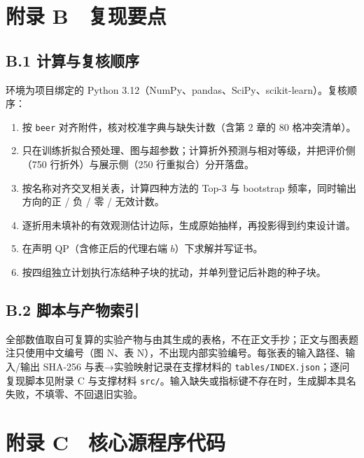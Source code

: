 \documentclass[11pt,a4paper]{article}
\providecommand{\tightlist}{%
  \setlength{\itemsep}{0pt}\setlength{\parskip}{0pt}}
\begin{document}
\section*{附录
B　复现要点}\label{ux9644ux5f55-b-ux590dux73b0ux8981ux70b9}

\subsection*{B.1
计算与复核顺序}\label{b.1-ux8ba1ux7b97ux4e0eux590dux6838ux987aux5e8f}

环境为项目绑定的 Python
3.12（NumPy、pandas、SciPy、scikit-learn）。复核顺序：

\begin{enumerate}
\def\labelenumi{\arabic{enumi}.}
\tightlist
\item
  按 \texttt{beer} 对齐附件，核对校准字典与缺失计数（含第 2 章的 80
  格冲突清单）。
\item
  只在训练折拟合预处理、图与超参数；计算折外预测与相对等级，并把评价侧（750
  行折外）与展示侧（250 行重拟合）分开落盘。
\item
  按名称对齐交叉相关表，计算四种方法的 Top-3 与 bootstrap
  频率，同时输出方向的正 / 负 / 零 / 无效计数。
\item
  逐折用未填补的有效观测估计边际，生成原始抽样，再投影得到约束设计谱。
\item
  在声明 QP（含修正后的代理右端 \(b\)）下求解并写证书。
\item
  按四组独立计划执行冻结种子块的扰动，并单列登记后补跑的种子块。
\end{enumerate}

\subsection*{B.2
脚本与产物索引}\label{b.2-ux811aux672cux4e0eux4ea7ux7269ux7d22ux5f15}

全部数值取自可复算的实验产物与由其生成的表格，不在正文手抄；正文与图表题注只使用中文编号（图
N、表 N），不出现内部实验编号。每张表的输入路径、输入/输出 SHA-256
与表→实验映射记录在支撑材料的
\texttt{tables/\allowbreak{}INDEX.json}；逐问复现脚本见附录 C 与支撑材料
\texttt{src/}。输入缺失或指标键不存在时，生成脚本具名失败，不填零、不回退旧实验。

\newpage

\section*{附录
C　核心源程序代码}\label{ux9644ux5f55-c-ux6838ux5fc3ux6e90ux7a0bux5e8fux4ee3ux7801}
\end{document}
